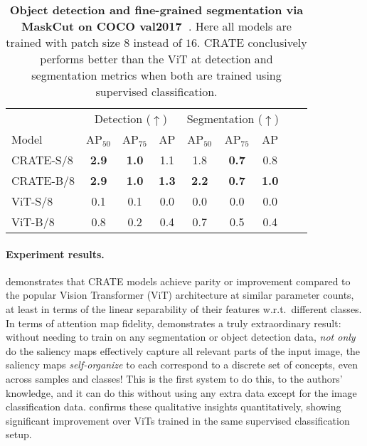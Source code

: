 \documentclass[\toplevelprefix/book-main.tex]{subfiles}
\begin{document}
\begin{table}
    \centering
    \begin{tabular}{@{}lcccccccc@{}}
    \toprule
     &  \multicolumn{3}{c}{Detection (\(\uparrow\))} &  \multicolumn{3}{c}{Segmentation (\(\uparrow\))} \\ 
    Model & AP$_{50}$ & AP$_{75}$ & AP & AP$_{50}$ & AP$_{75}$ & AP  \\ 
    \midrule
    CRATE-S/8 & \textbf{2.9} & \textbf{1.0} & 1.1 & 1.8 & \textbf{0.7} & 0.8 \\
    CRATE-B/8 & \textbf{2.9} & \textbf{1.0} & \textbf{1.3} & \textbf{2.2} & \textbf{0.7} & \textbf{1.0} \\
    ViT-S/8 & 0.1& 0.1 & 0.0 & 0.0 & 0.0 & 0.0 \\
    ViT-B/8 & 0.8 & 0.2 & 0.4 & 0.7 & 0.5 & 0.4 \\
    \bottomrule
    \end{tabular}
    \caption{\small \textbf{Object detection and fine-grained segmentation via MaskCut on COCO {val2017}~\citep{lin2014microsoft}}. Here all models are trained with patch size \(8\) instead of \(16\). CRATE conclusively performs better than the ViT at detection and segmentation metrics when both are trained using supervised classification.}
    \label{tab:crate_detection_segmentation}
\end{table}


\paragraph{Experiment results.} 

 demonstrates that CRATE models achieve parity or improvement compared to the popular Vision Transformer (ViT) architecture at similar parameter counts, at least in terms of the linear separability of their features w.r.t.~different classes. In terms of attention map fidelity,  demonstrates a truly extraordinary result: without needing to train on any segmentation or object detection data, \textit{not only} do the saliency maps effectively capture all relevant parts of the input image, the saliency maps \textit{self-organize} to each correspond to a discrete set of concepts, even across samples and classes! This is the first system to do this, to the authors' knowledge, and it can do this without using any extra data except for the image classification data.  confirms these qualitative insights quantitatively, showing significant improvement over ViTs trained in the same supervised classification setup.
\end{document}
